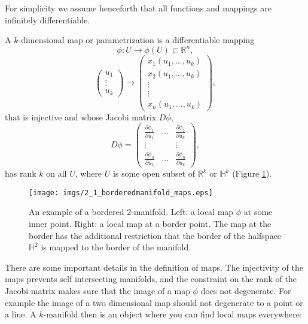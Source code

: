 For simplicity we assume henceforth that all functions and mappings are infinitely differentiable.
\[\]		
		
\begin{definition}[Map] A $k$-dimensional map or parametrization is a differentiable mapping 
\[\phi: U \rightarrow \phi(U)\subset \mathbb R^n,\] 
\[\begin{pmatrix}
	u_1\\ \vdots \\ u_k
\end{pmatrix} \rightarrow \begin{pmatrix}x_1(u_1,...,u_k)\\x_2(u_1,...,u_k)\\ \vdots \\ \vdots \\ x_n(u_1,...,u_k)\end{pmatrix},\]
that is injective and whose Jacobi matrix $D\phi$,
\[D\phi = \begin{pmatrix}
\frac{\partial\phi_1}{\partial u_1} & ... & \frac{\partial\phi_1}{\partial u_k} \\
\vdots & & \vdots \\
\frac{\partial\phi_n}{\partial u_1} & ... & \frac{\partial\phi_n}{\partial u_k}
\end{pmatrix},\]
 has rank $k$ on all $U$, where $U$ is some open subset of $\mathbb R^k$ or $\mathbb H^k$ (Figure \ref{fig::2_1_mapping}). 		
\end{definition} 

\begin{figure}
	\begin{center}
		\texttt{[image: imgs/2\_1\_borderedmanifold\_maps.eps]}
		\caption{An example of a bordered 2-manifold. Left: a local map $\phi$ at some inner point. Right: a local map at a border point. The map at the border has the additional restriction that the border of the halfspace $\mathbb H^2$ is mapped to the border of the manifold.}
		\label{fig::2_1_mapping}
	\end{center}
\end{figure}

There are some important details in the definition of maps. The injectivity of the maps prevents self intersecting manifolds, and the constraint on the rank of the Jacobi matrix makes sure that the image of a map $\phi$ does not degenerate. For example the image of a two dimensional map should not degenerate to a point or a line. A $k$-manifold then is an object where you can find local maps everywhere:

